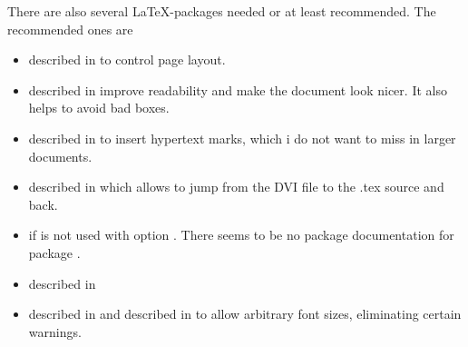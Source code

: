 \documentclass[12pt]{book}
\newif\iflatextortf %
\begin{document}
There are also several \LaTeX-packages needed or at least recommended. 
The recommended ones are 
%
\begin{itemize}
\item
{} described in \cite{GeomP} 
to control page layout. 
\item
{} described in \cite{MicroTyP} improve readability 
and make the document look nicer. 
It also helps to avoid bad boxes. 
\item
{} described in \cite{HyperTextP} 
to insert hypertext marks, which i do not want to miss in larger documents. 
\item
{} described in \cite{SrcLtxP} 
which allows to jump from the DVI file to the .tex source and back.
\item
{} 
if  is not used with option . 
There seems to be no package documentation for package . 
\item
{} described in \cite{BooktP} 

\item
{} described in \cite{FixCmP} and 
 described in \cite{AnyfontsizeP} 
to allow arbitrary font sizes, eliminating certain warnings. 
\end{itemize}
\end{document}
